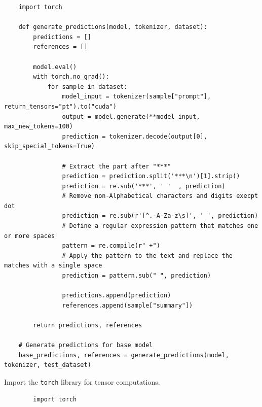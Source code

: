 \documentclass{solutionclass} %
\begin{document}
\begin{lstlisting}
	import torch

	def generate_predictions(model, tokenizer, dataset):
		predictions = []
		references = []
	
		model.eval()
		with torch.no_grad():
			for sample in dataset:
				model_input = tokenizer(sample["prompt"], return_tensors="pt").to("cuda")
				output = model.generate(**model_input, max_new_tokens=100)
				prediction = tokenizer.decode(output[0], skip_special_tokens=True)
			
				# Extract the part after "***"
				prediction = prediction.split('***\n')[1].strip()
				prediction = re.sub('***', ' '  , prediction)
				# Remove non-Alphabetical characters and digits execpt dot
				prediction = re.sub(r'[^.-A-Za-z\s]', ' ', prediction)
				# Define a regular expression pattern that matches one or more spaces
				pattern = re.compile(r" +")
				# Apply the pattern to the text and replace the matches with a single space
				prediction = pattern.sub(" ", prediction)
				
				predictions.append(prediction)
				references.append(sample["summary"])
	
		return predictions, references
	
	# Generate predictions for base model
	base_predictions, references = generate_predictions(model, tokenizer, test_dataset)
\end{lstlisting}

\begin{solution}
	Import the \texttt{torch} library for tensor computations.
	\begin{lstlisting}
		import torch
	\end{lstlisting}
\end{solution}
\end{document}
